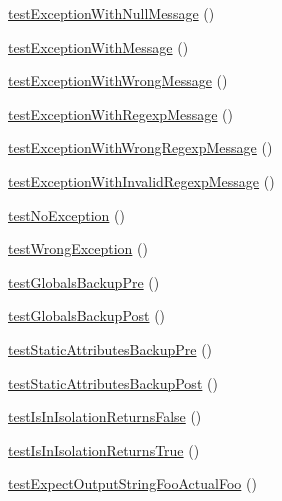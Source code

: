 \begin{DoxyCompactItemize}
\item 
\mbox{\hyperlink{class_framework___test_case_test_a53845466658be9c63221f07dbf8b0f18}{test\+Exception\+With\+Null\+Message}} ()
\item 
\mbox{\hyperlink{class_framework___test_case_test_a845b92f22ad8681d36c9c86556e71af9}{test\+Exception\+With\+Message}} ()
\item 
\mbox{\hyperlink{class_framework___test_case_test_a9e8f0d5a7756d8ff6d0ab5ca25eb67b6}{test\+Exception\+With\+Wrong\+Message}} ()
\item 
\mbox{\hyperlink{class_framework___test_case_test_ad87e8c822edb1e77d68136e4770e1732}{test\+Exception\+With\+Regexp\+Message}} ()
\item 
\mbox{\hyperlink{class_framework___test_case_test_a3066442e3ec038e914d4a52182b59fb6}{test\+Exception\+With\+Wrong\+Regexp\+Message}} ()
\item 
\mbox{\hyperlink{class_framework___test_case_test_a893885c6994a08c05367248e18e00c43}{test\+Exception\+With\+Invalid\+Regexp\+Message}} ()
\item 
\mbox{\hyperlink{class_framework___test_case_test_a3651b0fdfc238e6d84010684b3320655}{test\+No\+Exception}} ()
\item 
\mbox{\hyperlink{class_framework___test_case_test_af8086710c75a9c72af8af86dcfb5455e}{test\+Wrong\+Exception}} ()
\item 
\mbox{\hyperlink{class_framework___test_case_test_a2b86f900ddfcfbf00f582edbd207e4d0}{test\+Globals\+Backup\+Pre}} ()
\item 
\mbox{\hyperlink{class_framework___test_case_test_a9c6f16978da7b24cfe1c39f4a05b8f7c}{test\+Globals\+Backup\+Post}} ()
\item 
\mbox{\hyperlink{class_framework___test_case_test_a0656dea9b283bff960fbd121ef1948e1}{test\+Static\+Attributes\+Backup\+Pre}} ()
\item 
\mbox{\hyperlink{class_framework___test_case_test_a13ffc3ec3e704fd45cf393dcb1d5ae53}{test\+Static\+Attributes\+Backup\+Post}} ()
\item 
\mbox{\hyperlink{class_framework___test_case_test_a36a6716a8709773492b2c96dbe064bd5}{test\+Is\+In\+Isolation\+Returns\+False}} ()
\item 
\mbox{\hyperlink{class_framework___test_case_test_aa8d1313a628c774492dbfffd159d91b5}{test\+Is\+In\+Isolation\+Returns\+True}} ()
\item 
\mbox{\hyperlink{class_framework___test_case_test_ae66153b89cf146126a29b984028bd88a}{test\+Expect\+Output\+String\+Foo\+Actual\+Foo}} ()
\item 

\end{DoxyCompactItemize}
